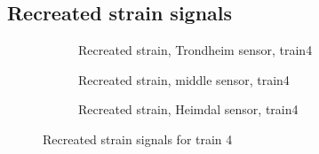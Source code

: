 \subsection{Recreated strain signals}
\begin{figure}[h]
  \begin{subfigure}[t]{0.9\textwidth}
    \centering
    
    \caption{Recreated strain, Trondheim sensor, train4} %
    \label{recreated_sensor_trond_train4}
  \end{subfigure}
%
  \begin{subfigure}[t]{0.9\textwidth}
    \centering
    
    \caption{Recreated strain, middle sensor, train4} %
    \label{recreated_sensor_middle_train4}
  \end{subfigure}
%
  \begin{subfigure}[t]{0.9\textwidth}
    \centering
    
    \caption{Recreated strain, Heimdal sensor, train4} %
    \label{recreated_sensor_heimdal_train4}
  \end{subfigure}
%
  \caption{Recreated strain signals for train 4}
  \label{fig:recreated_strains_train4}
\end{figure}


